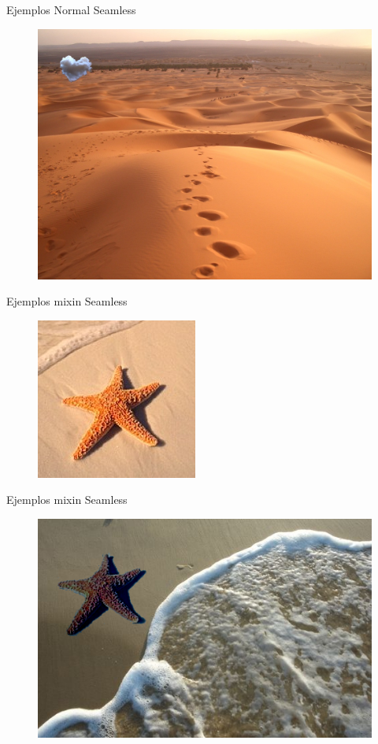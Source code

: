 \begin{frame}{Ejemplos Normal Seamless}
  \begin{block}{}
  \begin{figure}[H]
  \centering
  \includegraphics[scale=.5]{./img/normalblue}
  \end{figure}
  \end{block}
\end{frame}

\begin{frame}{Ejemplos mixin Seamless}
  \begin{block}{}
  \begin{figure}[H]
  \centering
  \includegraphics[scale=.5]{./img/estrella_src.jpg}
  \end{figure}
  \end{block}
\end{frame}

\begin{frame}{Ejemplos mixin Seamless}
  \begin{block}{}
  \begin{figure}[H]
  \centering
  \includegraphics[scale=.5]{./img/mix_seastar}
  \end{figure}
  \end{block}
\end{frame}

